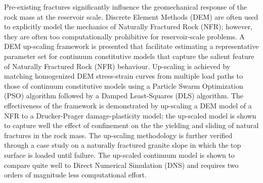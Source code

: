 Pre-existing fractures significantly influence the geomechanical response of the rock mass at the reservoir scale.  Discrete Element Methods (DEM) are often used to explicitly model the mechanics of Naturally Fractured Rock (NFR); however, they are often too computationally prohibitive for reservoir-scale problems. A DEM up-scaling framework is presented that facilitate estimating a representative parameter set for continuum constitutive models that capture the salient feature of Naturally Fractured Rock (NFR) behaviour. Up-scaling is achieved by matching homogenized DEM stress-strain curves from multiple load paths to those of continuum constitutive models using a Particle Swarm Optimization (PSO) algorithm followed by a Damped Least-Squares (DLS) algorithm. The effectiveness of the framework is demonstrated by up-scaling a DEM model of a NFR to a Drucker-Prager damage-plasticity model; the up-scaled model is shown to capture well the effect of confinement on the the yielding and sliding of natural fractures in the rock mass. The up-scaling methodology is further verified through a case study on a naturally fractured granite slope in which the top surface is loaded until failure. The up-scaled continuum model is shown to compare quite well to Direct Numerical Simulation (DNS) and requires two orders of magnitude less computational effort.